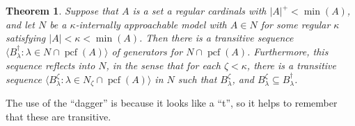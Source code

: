 \documentclass[10pt]{amsart}
\theoremstyle{plain}
\newtheorem{theorem}{Theorem}
\theoremstyle{definition}
\theoremstyle{remark}
\DeclareMathOperator{\pcf}{pcf}
\numberwithin{equation}{section}
\begin{document}
\begin{theorem}
\label{thm:TransGenExist} Suppose that $A$ is a set a regular cardinals with $|A|^+<\min(A)$, and let $N$ be a
$\kappa$-internally approachable model with $A\in N$ for some regular $\kappa$ satisfying $|A|<\kappa<\min(A)$. Then there is a
transitive sequence $\langle B^\dagger_\lambda:\lambda\in N\cap\pcf(A)\rangle$ of generators for
    $N\cap\pcf(A)$.  Furthermore, this sequence reflects into $N$, in the sense that for each $\zeta<\kappa$, there is a transitive
     sequence $\langle B^\zeta_\lambda:\lambda\in N_\zeta\cap\pcf(A)\rangle$ in $N$ such that $B^\zeta_\lambda$, and
      $B^\zeta_\lambda\subseteq B^\dagger_\lambda$.
\end{theorem}

The use of the ``dagger'' is because it looks like a ``t'', so it helps to remember that these are transitive.
\end{document}

